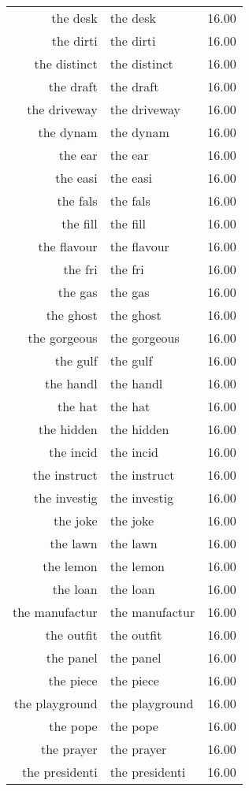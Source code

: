 \begin{table}[ht]
\begin{tabular}{rlr}
  the desk & the desk & 16.00 \\ 
  the dirti & the dirti & 16.00 \\ 
  the distinct & the distinct & 16.00 \\ 
  the draft & the draft & 16.00 \\ 
  the driveway & the driveway & 16.00 \\ 
  the dynam & the dynam & 16.00 \\ 
  the ear & the ear & 16.00 \\ 
  the easi & the easi & 16.00 \\ 
  the fals & the fals & 16.00 \\ 
  the fill & the fill & 16.00 \\ 
  the flavour & the flavour & 16.00 \\ 
  the fri & the fri & 16.00 \\ 
  the gas & the gas & 16.00 \\ 
  the ghost & the ghost & 16.00 \\ 
  the gorgeous & the gorgeous & 16.00 \\ 
  the gulf & the gulf & 16.00 \\ 
  the handl & the handl & 16.00 \\ 
  the hat & the hat & 16.00 \\ 
  the hidden & the hidden & 16.00 \\ 
  the incid & the incid & 16.00 \\ 
  the instruct & the instruct & 16.00 \\ 
  the investig & the investig & 16.00 \\ 
  the joke & the joke & 16.00 \\ 
  the lawn & the lawn & 16.00 \\ 
  the lemon & the lemon & 16.00 \\ 
  the loan & the loan & 16.00 \\ 
  the manufactur & the manufactur & 16.00 \\ 
  the outfit & the outfit & 16.00 \\ 
  the panel & the panel & 16.00 \\ 
  the piece & the piece & 16.00 \\ 
  the playground & the playground & 16.00 \\ 
  the pope & the pope & 16.00 \\ 
  the prayer & the prayer & 16.00 \\ 
  the presidenti & the presidenti & 16.00 \\ 

\end{tabular}
\end{table}
